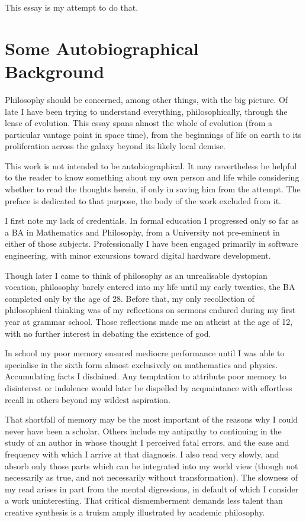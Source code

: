 \documentclass[10pt,titlepage]{book}
\begin{document}
This essay is my attempt to do that.

\section{Some Autobiographical Background}

Philosophy should be concerned, among other things, with the big picture.
Of late I have been trying to understand everything, philosophically, through the lense of evolution.
This essay spans almost the whole of evolution (from a particular vantage point in space time), from the beginnings of life on earth to its proliferation across the galaxy beyond its likely local demise.


This work is not intended to be autobiographical.
It may nevertheless be helpful to the reader to know something about my own person and life while considering whether to read the thoughts herein, if only in saving him from the attempt.
The preface is dedicated to that purpose, the body of the work excluded from it.

I first note my lack of credentials.
In formal education I progressed only so far as a BA in Mathematics and Philosophy, from a University not pre-eminent in either of those subjects.
Professionally I have been engaged primarily in software engineering, with minor excursions toward digital hardware development.

Though later I came to think of philosophy as an unrealisable dystopian vocation, philosophy barely entered into my life until my early twenties, the BA completed only by the age of 28.
Before that, my only recollection of philosophical thinking was of my reflections on sermons endured during my first year at grammar school.
Those reflections made me an atheist at the age of 12, with no further interest in debating the existence of god.

In school my poor memory ensured mediocre performance until I was able to specialise in the sixth form almost exclusively on mathematics and physics.
Accumulating facts I disdained.
Any temptation to attribute poor memory to disinterest or indolence would later be dispelled by acquaintance with effortless recall in others beyond my wildest aspiration.

That shortfall of memory may be the most important of the reasons why I could never have been a scholar.
Others include my antipathy to continuing in the study of an author in whose thought I perceived fatal errors, and the ease and frequency with which I arrive at that diagnosis.
I also read very slowly, and absorb only those parts which can be integrated into my world view (though not necessarily as true, and not necessarily without transformation).
The slowness of my read arises in part from the mental digressions, in default of which I consider a work uninteresting.
That critical dismemberment demands less talent than creative synthesis is a truism amply illustrated by academic philosophy.
\end{document}
